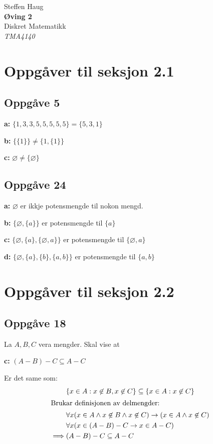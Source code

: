 \documentclass[a4paper, 11pt]{article}
\author{\forfatter}
\date{}
\newcommand{\tittel}{Øving 2}
\newcommand{\fag}{Diskret Matematikk}
\newcommand{\fagkode}{TMA4140}
\newcommand{\forfatter}{Steffen Haug}
\newcommand{\deloppg}[1]{\vspace{1mm}\noindent \textbf{\themecolor{#1:}}}
\newcommand{\themeshade}{Mahogany}
\newcommand{\themecolor}[1]{\textcolor{\themeshade}{#1}}
\newcommand*{\titleTH}{\begingroup %
\raggedleft %
\vspace*{\baselineskip} %

{\Large \forfatter}\\[0.167\textheight] %

{\LARGE\bfseries \tittel}\\[\baselineskip] %

{\themecolor{\Huge \fag}}\\[\baselineskip] %

{\Large \textit{\fagkode}}\par %

\vfill %
\endgroup}
\begin{document}
\pagestyle{empty}
\titleTH\newpage

\section{Oppgåver til seksjon 2.1} %
\subsection*{Oppgåve 5}

\deloppg{a} \( \{ 1,3,3,5,5,5,5,5 \} = \{5,3,1\}\)

\deloppg{b} \( \{\{1\}\} \neq \{1, \{1\}\} \)

\deloppg{c} \( \varnothing \neq \{\varnothing\} \)

\subsection*{Oppgåve 24}
\deloppg{a} \( \varnothing \) er ikkje potensmengde til nokon mengd.

\deloppg{b} \( \{\varnothing, \{a\} \} \) er potensmengde til \( \{a\} \)

\deloppg{c} \( \{ \varnothing, \{a\}, \{\varnothing, a\} \}\) er potensmengde til \(\{\varnothing, a\}\)

\deloppg{d} \( \{\varnothing, \{a\}, \{b\}, \{a,b\}\} \) er potensmengde til \(\{a,b\}\)


\section{Oppgåver til seksjon 2.2}

\subsection{Oppgåve 18}
\noindent La \(A,B,C\) vera mengder. Skal vise at

\deloppg{c} \( (A - B) - C \subseteq A - C \)

\noindent Er det same som:
\begin{align*}
    &\{x \in A : x \not\in B, x \not\in C\} \subseteq \{x \in A : x \not\in C\} \\
    \intertext{Brukar definisjonen av delmengder:}
    &\forall x (x \in A \land x\not\in B \land x\not\in C) \rightarrow (x \in A \land x \not\in C)\\
    &\forall x (x \in (A - B) - C \rightarrow x \in A - C) \\
    \implies &(A - B) - C \subseteq A - C
\end{align*}
\end{document}
